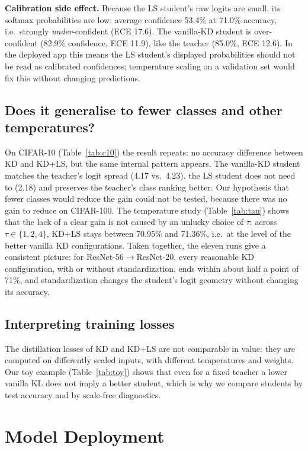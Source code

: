 \documentclass[12pt,a4paper]{article}
\begin{document}
\textbf{Calibration side effect.} Because the LS student's raw logits are small, its softmax probabilities are low: average confidence 53.4\% at 71.0\% accuracy, i.e.\ strongly \emph{under}-confident (ECE 17.6). The vanilla-KD student is over-confident (82.9\% confidence, ECE 11.9), like the teacher (85.0\%, ECE 12.6). In the deployed app this means the LS student's displayed probabilities should not be read as calibrated confidences; temperature scaling on a validation set would fix this without changing predictions.

\subsection{Does it generalise to fewer classes and other temperatures?}
On CIFAR-10 (Table~\ref{tab:c10}) the result repeats: no accuracy difference between KD and KD+LS, but the same internal pattern appears. The vanilla-KD student matches the teacher's logit spread (4.17 vs.\ 4.23), the LS student does not need to (2.18) and preserves the teacher's class ranking better. Our hypothesis that fewer classes would reduce the gain could not be tested, because there was no gain to reduce on CIFAR-100. The temperature study (Table~\ref{tab:tau}) shows that the lack of a clear gain is not caused by an unlucky choice of $\tau$: across $\tau\in\{1,2,4\}$, KD+LS stays between 70.95\% and 71.36\%, i.e.\ at the level of the better vanilla KD configurations. Taken together, the eleven runs give a consistent picture: for ResNet-56$\rightarrow$ResNet-20, every reasonable KD configuration, with or without standardization, ends within about half a point of 71\%, and standardization changes the student's logit geometry without changing its accuracy.

\subsection{Interpreting training losses}
The distillation losses of KD and KD+LS are not comparable in value: they are computed on differently scaled inputs, with different temperatures and weights. Our toy example (Table~\ref{tab:toy}) shows that even for a fixed teacher a lower vanilla KL does not imply a better student, which is why we compare students by test accuracy and by scale-free diagnostics.

\section{Model Deployment}
\label{sec:deploy}
\end{document}
